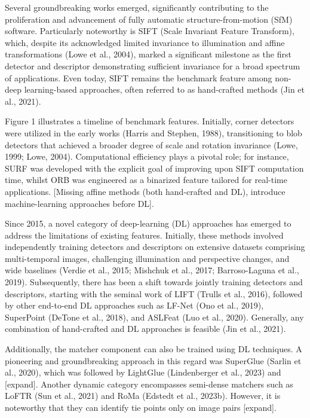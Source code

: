 Several groundbreaking works emerged, significantly contributing to the proliferation and advancement of fully automatic structure-from-motion (SfM) software. Particularly noteworthy is SIFT (Scale Invariant Feature Transform), which, despite its acknowledged limited invariance to illumination and affine transformations (Lowe et al., 2004), marked a significant milestone as the first detector and descriptor demonstrating sufficient invariance for a broad spectrum of applications. Even today, SIFT remains the benchmark feature among non-deep learning-based approaches, often referred to as hand-crafted methods (Jin et al., 2021). 

Figure 1 illustrates a timeline of benchmark features. Initially, corner detectors were utilized in the early works (Harris and Stephen, 1988), transitioning to blob detectors that achieved a broader degree of scale and rotation invariance (Lowe, 1999; Lowe, 2004). Computational efficiency plays a pivotal role; for instance, SURF was developed with the explicit goal of improving upon SIFT computation time, whilst ORB was engineered as a binarized feature tailored for real-time applications. [Missing affine methods (both hand-crafted and DL), introduce machine-learning approaches before DL]. 

Since 2015, a novel category of deep-learning (DL) approaches has emerged to address the limitations of existing features. Initially, these methods involved independently training detectors and descriptors on extensive datasets comprising multi-temporal images, challenging illumination and perspective changes, and wide baselines (Verdie et al., 2015; Mishchuk et al., 2017; Barroso-Laguna et al., 2019). Subsequently, there has been a shift towards jointly training detectors and descriptors, starting with the seminal work of LIFT (Trulls et al., 2016), followed by other end-to-end DL approaches such as LF-Net (Ono et al., 2019), SuperPoint (DeTone et al., 2018), and ASLFeat (Luo et al., 2020). Generally, any combination of hand-crafted and DL approaches is feasible (Jin et al., 2021). 

Additionally, the matcher component can also be trained using DL techniques. A pioneering and groundbreaking approach in this regard was SuperGlue (Sarlin et al., 2020), which was followed by LightGlue (Lindenberger et al., 2023) and [expand]. Another dynamic category encompasses semi-dense matchers such as LoFTR (Sun et al., 2021) and RoMa (Edstedt et al., 2023b). However, it is noteworthy that they can identify tie points only on image pairs [expand]. 

